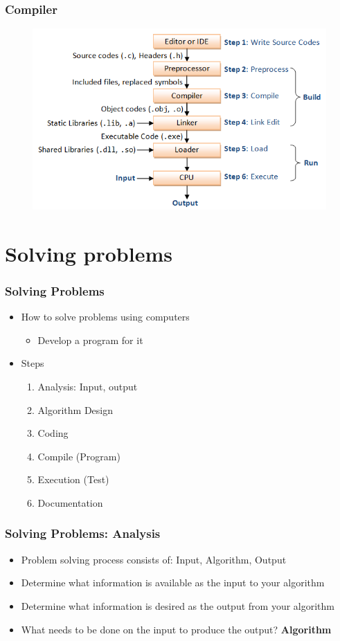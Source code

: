 \documentclass{../c-lecture}
\begin{document}
\begin{frame}
  \frametitle{Compiler}
  \begin{figure}
    \includegraphics[width=.75\textwidth]{./img/build-flow.png}
  \end{figure}
\end{frame}

\section{Solving problems}

\begin{frame}
  \frametitle{Solving Problems}
  \begin{itemize}
    \item How to solve problems using computers
    \begin{itemize}
      \item Develop a {\color{Orange} program} for it
    \end{itemize}
    \item Steps
    \begin{enumerate}
      \item Analysis: Input, output
      \item Algorithm Design
      \item Coding
      \item Compile (Program)
      \item Execution (Test)
      \item Documentation
    \end{enumerate}
  \end{itemize}
\end{frame}

\begin{frame}
  \frametitle{Solving Problems: Analysis}

  \begin{itemize}
    \item Problem solving process consists of: Input, Algorithm, Output
    \item Determine what information is available as the input to your algorithm
    \item Determine what information is desired as the output from your algorithm
    \item
      What needs to be done on the input to produce the output?
      \textbf{\color{Orange} Algorithm}
  \end{itemize}
\end{frame}
\end{document}
